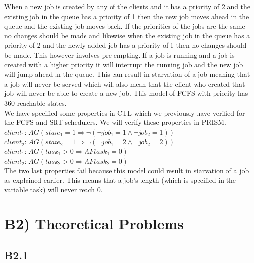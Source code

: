 \documentclass[12pt]{report}
\begin{document}
When a new job is created by any of the clients and it has a priority of 2 and the existing job in the queue has a priority of 1 then the new job moves ahead in the queue and the existing job moves back. If the priorities of the jobs are the same no changes should be made and likewise when the existing job in the queue has a priority of 2 and the newly added job has a priority of 1 then no changes should be made. This however involves pre-empting. If a job is running and a job is created with a higher priority it will interrupt the running job and the new job will jump ahead in the queue. This can result in starvation of a job meaning that a job will never be served which will also mean that the client who created that job will never be able to create a new job. This model of FCFS with priority has 360 reachable states.\\
We have specified some properties in CTL which we previously have verified for the FCFS and SRT schedulers. We will verify these properties in PRISM.\\
$client_1$: $AG (state_1 = 1 \Rightarrow \neg(\neg job_1 = 1 \wedge \neg job_2 = 1))$\\
$client_2$: $AG (state_2 = 1 \Rightarrow \neg(\neg job_1 = 2 \wedge \neg job_2 = 2))$\\
$client_1$: $AG(task_1>0 \Rightarrow AF task_1 = 0)$ \\
$client_2$: $AG(task_2>0 \Rightarrow AF task_2 = 0)$ \\

The two last properties fail because this model could result in starvation of a job as explained earlier. This means that a job's length (which is specified in the variable task) will never reach 0.

\section*{B2) Theoretical Problems}
\subsection*{B2.1}
\end{document}
